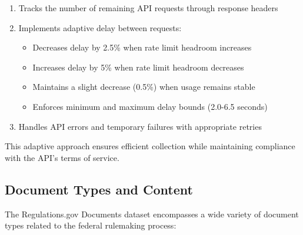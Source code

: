 \begin{enumerate}
    \item Tracks the number of remaining API requests through response headers
    \item Implements adaptive delay between requests:
    \begin{itemize}
        \item Decreases delay by 2.5\% when rate limit headroom increases
        \item Increases delay by 5\% when rate limit headroom decreases
        \item Maintains a slight decrease (0.5\%) when usage remains stable
        \item Enforces minimum and maximum delay bounds (2.0-6.5 seconds)
    \end{itemize}
    \item Handles API errors and temporary failures with appropriate retries
\end{enumerate}

This adaptive approach ensures efficient collection while maintaining compliance with the API's terms of service.

\subsection{Document Types and Content}

The Regulations.gov Documents dataset encompasses a wide variety of document types related to the federal rulemaking process:

